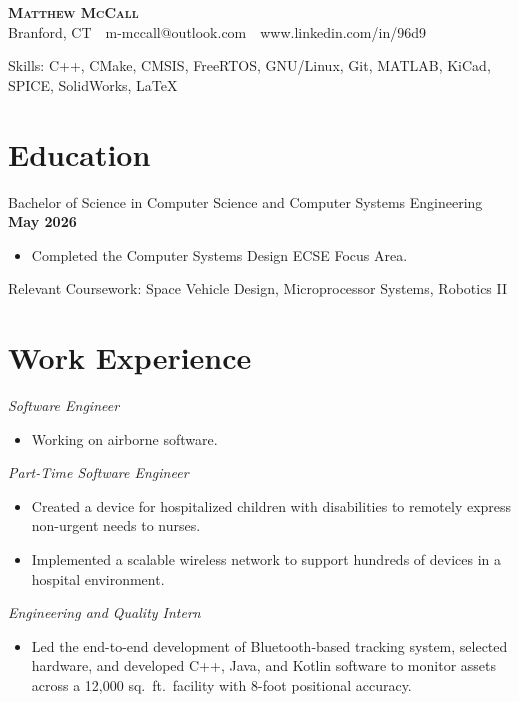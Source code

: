 \documentclass[11pt]{article}
\begin{document}
\begin{center}
{\LARGE\bfseries\scshape Matthew McCall} \\
Branford, CT \,\textbullet\, m-mccall@outlook.com \,\textbullet\, www.linkedin.com/in/96d9
\end{center}

{\selectfont Skills:} C++, CMake, CMSIS, FreeRTOS, GNU/Linux, Git, MATLAB, KiCad, SPICE, SolidWorks, \LaTeX

\section*{Education}
Bachelor of Science in Computer Science and Computer Systems Engineering \hfill \textbf{May 2026}
\begin{itemize}
	\item Completed the Computer Systems Design ECSE Focus Area.
\end{itemize}
{\selectfont Relevant Coursework:} Space Vehicle Design, Microprocessor Systems, Robotics II

\section*{Work Experience}

\textit{Software Engineer}
\begin{itemize}
	\item Working on airborne software.
\end{itemize}

\textit{Part-Time Software Engineer}
\begin{itemize}
	\item Created a device for hospitalized children with disabilities to remotely express non-urgent needs to nurses.
	\item Implemented a scalable wireless network to support hundreds of devices in a hospital environment.
\end{itemize}

\textit{Engineering and Quality Intern}
\begin{itemize}
    \item Led the end-to-end development of Bluetooth-based tracking system, selected hardware, and developed C++, Java, and Kotlin software to monitor assets across a 12,000 sq.\ ft.\ facility with 8-foot positional accuracy.
\end{itemize}
\end{document}
